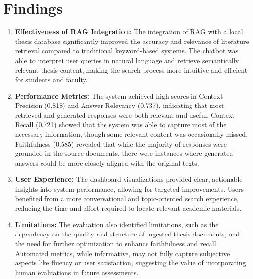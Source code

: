 \section*{Findings}
\begin{enumerate}
\item \textbf{Effectiveness of RAG Integration:} The integration of RAG with a local thesis database significantly improved the accuracy and relevance of literature retrieval compared to traditional keyword-based systems. The chatbot was able to interpret user queries in natural language and retrieve semantically relevant thesis content, making the search process more intuitive and efficient for students and faculty.
\item \textbf{Performance Metrics:} The system achieved high scores in Context Precision (0.818) and Answer Relevancy (0.737), indicating that most retrieved and generated responses were both relevant and useful. Context Recall (0.721) showed that the system was able to capture most of the necessary information, though some relevant content was occasionally missed. Faithfulness (0.585) revealed that while the majority of responses were grounded in the source documents, there were instances where generated answers could be more closely aligned with the original texts.
\item \textbf{User Experience:} The dashboard visualizations provided clear, actionable insights into system performance, allowing for targeted improvements. Users benefited from a more conversational and topic-oriented search experience, reducing the time and effort required to locate relevant academic materials.
\item \textbf{Limitations:} The evaluation also identified limitations, such as the dependency on the quality and structure of ingested thesis documents, and the need for further optimization to enhance faithfulness and recall. Automated metrics, while informative, may not fully capture subjective aspects like fluency or user satisfaction, suggesting the value of incorporating human evaluations in future assessments.
\end{enumerate}

